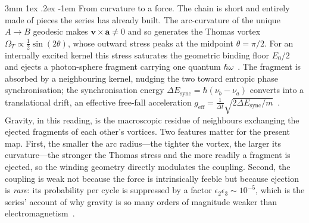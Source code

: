\documentclass[%
 reprint, amsmath,amssymb, aps, prb, ]{revtex4-2}
\makeatletter
\numberwithin{equation}{section}
\renewcommand\paragraph{%
  \@startsection{paragraph}{4}{\z@}%
    {3mm \@plus 1ex \@minus .2ex}%
    {-1em}%
    {\normalfont\normalsize\itshape}}
\makeatother
\begin{document}
\paragraph{From curvature to a force.}
The chain is short and entirely made of pieces the series has already built. The arc-curvature of the unique $A\to B$ geodesic makes $\mathbf v\times\mathbf a\neq 0$ and so generates the Thomas vortex $\Omega_T\propto\tfrac12\sin(2\theta)$, whose outward stress peaks at the midpoint $\theta=\pi/2$. For an internally excited kernel this stress saturates the geometric binding floor $E_0/2$ and ejects a photon-sphere fragment carrying one quantum $\hbar\omega$~\cite{hanamura49}. The fragment is absorbed by a neighbouring kernel, nudging the two toward entropic phase synchronisation; the synchronisation energy $\Delta E_{\text{sync}}=\hbar(\nu_b-\nu_a)$ converts into a translational drift, an effective free-fall acceleration $g_{\text{eff}}=\tfrac{1}{\Delta t}\sqrt{2\Delta E_{\text{sync}}/m}$~\cite{hanamura34}. Gravity, in this reading, is the macroscopic residue of neighbours exchanging the ejected fragments of each other's vortices. Two features matter for the present map. First, the smaller the arc radius---the tighter the vortex, the larger its curvature---the stronger the Thomas stress and the more readily a fragment is ejected, so the winding geometry directly modulates the coupling. Second, the coupling is weak not because the force is intrinsically feeble but because ejection is \emph{rare}: its probability per cycle is suppressed by a factor $\epsilon_2\epsilon_3\sim10^{-5}$, which is the series' account of why gravity is so many orders of magnitude weaker than electromagnetism~\cite{hanamura34,hanamura49}.
\end{document}

